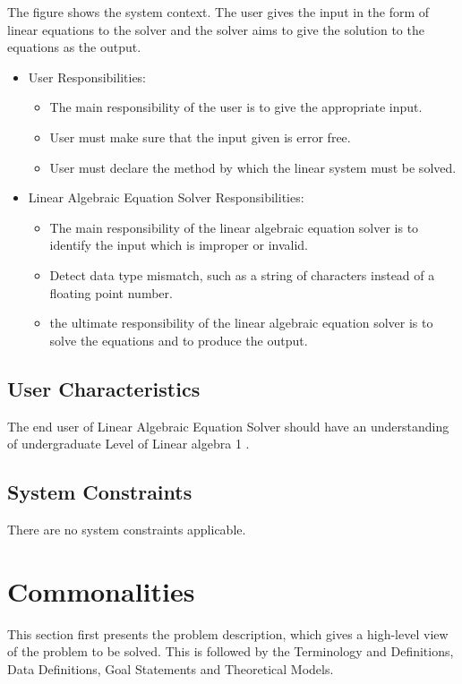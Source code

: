 \documentclass[12pt]{article}
\newcommand{\progname}{Linear Algebraic Equation Solver} %
\begin{document}
The figure shows the system context. The user gives the input in the form of
linear equations to the solver and the solver aims to give the solution to the
equations as the output.



\begin{itemize}
\item User Responsibilities:
\begin{itemize}
\item The main responsibility of the user is to give the appropriate input.
\item User must make sure that the input given is error free.
\item User must declare the method by which the linear system must be solved.
\end{itemize}
\item \progname{} Responsibilities:
\begin{itemize}
\item The main responsibility of the linear algebraic equation solver is to
identify the input which is improper or invalid.
\item Detect data type mismatch, such as a string of characters instead of a
  floating point number.
\item the ultimate responsibility of the linear algebraic equation solver is to
solve the equations and to produce the output.
\end{itemize}
\end{itemize}

\subsection{User Characteristics} \label{SecUserCharacteristics}

The end user of \progname{} should have an understanding of undergraduate Level
of Linear algebra 1 .

\subsection{System Constraints}

There are no system constraints applicable.

\section{Commonalities}

This section first presents the problem description, which gives a high-level
view of the problem to be solved. This is followed by the Terminology and
Definitions, Data Definitions, Goal Statements and Theoretical Models.
\end{document}
